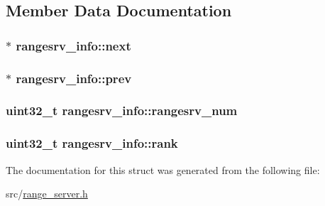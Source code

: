 \subsection{Member Data Documentation}
\hypertarget{structrangesrv__info_a7f87ab56d045e24e315b354075208b6d}{
\subsubsection[{next}]{$\ast$ rangesrv\-\_\-info\-::next}}\label{da/dce/structrangesrv__info_a7f87ab56d045e24e315b354075208b6d}
\hypertarget{structrangesrv__info_af0a671859e5383bf4bab7f7a53b49b3b}{
\subsubsection[{prev}]{$\ast$ rangesrv\-\_\-info\-::prev}}\label{da/dce/structrangesrv__info_af0a671859e5383bf4bab7f7a53b49b3b}
\hypertarget{structrangesrv__info_a90a6558f7f1922ae3394838255a937f3}{
\subsubsection[{rangesrv\-\_\-num}]{\setlength{\rightskip}{0pt plus 5cm}uint32\-\_\-t rangesrv\-\_\-info\-::rangesrv\-\_\-num}}\label{da/dce/structrangesrv__info_a90a6558f7f1922ae3394838255a937f3}
\hypertarget{structrangesrv__info_af545372bc5a40a38b84408a208866960}{
\subsubsection[{rank}]{\setlength{\rightskip}{0pt plus 5cm}uint32\-\_\-t rangesrv\-\_\-info\-::rank}}\label{da/dce/structrangesrv__info_af545372bc5a40a38b84408a208866960}


The documentation for this struct was generated from the following file\-:\begin{DoxyCompactItemize}
\item 
src/\hyperlink{range__server_8h}{range\-\_\-server.\-h}\end{DoxyCompactItemize}
